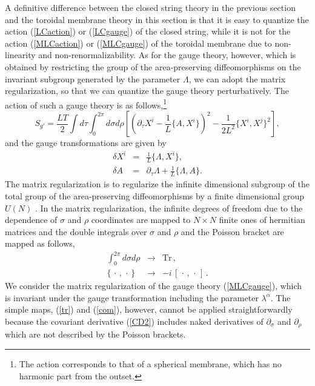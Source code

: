 \documentclass[12pt,a4paper]{article}
\newcommand{\ptau}{\partial_\tau}
\newcommand{\psig}{\partial_\sigma}
\newcommand{\prho}{\partial_\rho}
\begin{document}
A definitive difference between the closed string theory in the
previous section and the toroidal membrane theory in this section is
that it is easy to quantize the action (\ref{LCaction}) or
(\ref{LCgauge}) of the closed string, while it is not for the action
(\ref{MLCaction}) or (\ref{MLCgauge}) of the toroidal membrane due to
non-linearity and non-renormalizability.
As for the gauge theory, however, which is obtained by restricting
the group of the area-preserving diffeomorphisms on the invariant
subgroup generated by the parameter $\Lambda$, we can adopt the matrix
regularization, so that we can quantize the gauge theory
perturbatively.
The action of such a gauge theory is as follows,\footnote{The action
corresponds to that of a spherical membrane, which has no harmonic
part from the outset.}
\begin{equation}
  S_{g'}=\frac{LT}{2}\int d\tau \int_0^{2\pi}d\sigma d\rho\left[
    \left(\ptau X^i -\frac{1}{L}\{A,X^i\}\right)^2
	-\frac{1}{2L^2}\{X^{i},X^{j}\}^2\right]\label{MLCgaugeSp},
\end{equation}
and the gauge transformations are given by
\begin{eqnarray}
\delta X^i&=&\frac{1}{L}\{\Lambda,X^i\},\label{Mgtrans1'Sp}\\
\delta A&=&\ptau\Lambda +\frac{1}{L}\{\Lambda,A\}.\label{Mgtrans2'Sp}
\end{eqnarray}
The matrix regularization is to regularize the infinite dimensional
subgroup of the total group of the area-preserving diffeomorphisms
by a finite dimensional group $U(N)$ \cite{Hop,dWHN}.
In the matrix regularization, the infinite degrees of freedom due to
the dependence of $\sigma$ and $\rho$ coordinates are mapped to
$N\times N$ finite ones of hermitian matrices and the double integrals
over $\sigma$ and $\rho$ and the Poisson bracket are mapped as
follows,
\begin{eqnarray}
  \int_0^{2\pi}d\sigma d\rho &\to& \mbox{Tr}\,,\label{tr}\\
  \{\,\cdot\,,\,\cdot\,\} &\to&
	  -i\,[\,\cdot\,,\,\cdot\,]\,.\label{com}
\end{eqnarray}
We consider the matrix regularization of the gauge theory
(\ref{MLCgauge}), which is invariant under the gauge transformation
including the parameter $\lambda^{\alpha}$.
The simple maps, (\ref{tr}) and (\ref{com}), however, cannot be
applied straightforwardly because the covariant derivative (\ref{CD2})
includes naked derivatives of $\psig$ and $\prho$ which are not
described by the Poisson brackets.
\end{document}
